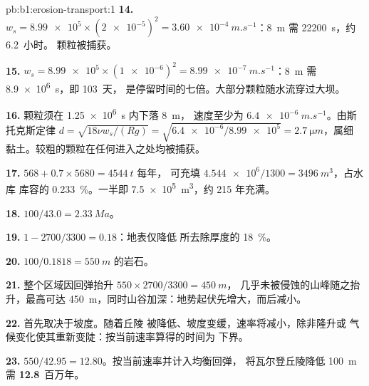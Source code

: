 \begin{solution}{pb:b1:erosion-transport:1}
\textbf{14.} $w_s = \num{8.99e5} \times (\num{2e-5})^2 =
\qty{3.60e-4}{m.s^{-1}}$：\qty{8}{m} 需 \qty{22200}{s}，约 \num{6.2}~小时。
颗粒被捕获。

\textbf{15.} $w_s = \num{8.99e5} \times (\num{1e-6})^2 =
\qty{8.99e-7}{m.s^{-1}}$：\qty{8}{m} 需 \qty{8.9e6}{s}，即 \num{103}~天，
是停留时间的七倍。大部分颗粒随水流穿过大坝。

\textbf{16.} 颗粒须在 \qty{1.25e6}{s} 内下落 \qty{8}{m}，
速度至少为 $\qty{6.4e-6}{m.s^{-1}}$。由斯托克斯定律 $d = \sqrt{18\nu
w_s/(Rg)} = \sqrt{\num{6.4e-6}/\num{8.99e5}} = \qty{2.7}{\micro m}$，属细
黏土。较粗的颗粒在任何进入之处均被捕获。

\textbf{17.} $568 + 0.7 \times 5680 = \qty{4544}{t}$ 每年，
可充填 $\num{4.544e6}/1300 = \qty{3496}{m^3}$，占水库
库容的 \qty{0.233}{\percent}。一半即 \qty{7.5e5}{m^3}，约 \num{215} 年充满。

\textbf{18.} $100/43.0 = \qty{2.33}{Ma}$。

\textbf{19.} $1 - 2700/3300 = 0.18$：地表仅降低
所去除厚度的 \qty{18}{\percent}。

\textbf{20.} $100/0.1818 = \qty{550}{m}$ 的岩石。

\textbf{21.} 整个区域因回弹抬升 $550 \times 2700/3300 = \qty{450}{m}$，
几乎未被侵蚀的山峰随之抬升，最高可达
\qty{450}{m}，同时山谷加深：地势起伏先增大，而后减小。

\textbf{22.} 首先取决于坡度。随着丘陵
被降低、坡度变缓，速率将减小，除非隆升或
气候变化使其重新变陡：按当前速率算得的时间为
下界。

\textbf{23.} $550/42.95 = 12.80$。按当前速率并计入均衡回弹，
将瓦尔登丘陵降低 \qty{100}{m} 需 \textbf{12.8}~百万年。
\end{solution}
